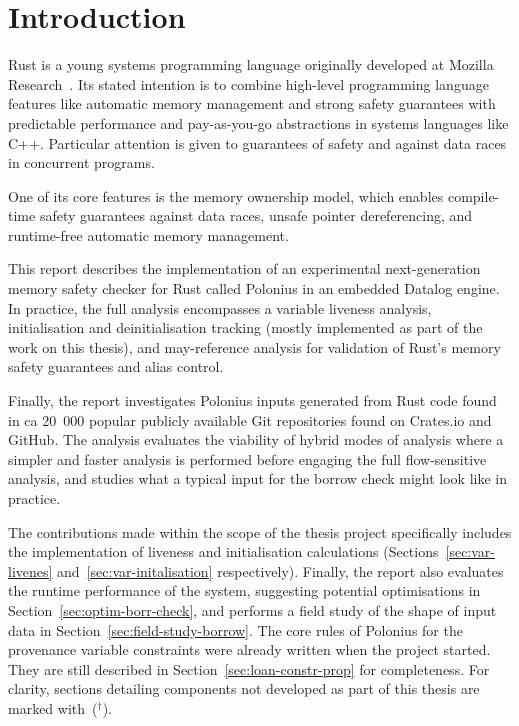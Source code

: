 \documentclass[11pt,a4paper,twoside,openany]{report}
\newcommand{\fixme}[1] {{\color{red}#1}}
\newcommand{\notmine}[0] {$^\dagger$}
\begin{document}
\begingroup
  \tableofcontents
  \listoffigures
  \listoftables
\endgroup
  

\chapter{Introduction}

Rust is a young systems programming language originally developed at Mozilla
Research~\cite{matsakis_rust_2014}. Its stated intention is to combine
high-level programming language features like automatic memory management and
strong safety guarantees with predictable performance and pay-as-you-go
abstractions in systems languages like C++. Particular attention is given to
guarantees of safety and against data races in concurrent programs.

One of its core features is the memory ownership model, which enables
compile-time safety guarantees against data races, unsafe pointer dereferencing,
and runtime-free automatic memory management.

This report describes the implementation of an experimental next-generation
memory safety checker for Rust called Polonius in an embedded Datalog engine. In
practice, the full analysis encompasses a variable liveness analysis,
initialisation and deinitialisation tracking (mostly implemented as part of the
work on this thesis), and may-reference analysis for validation of Rust's memory
safety guarantees and alias control.

Finally, the report investigates Polonius inputs generated from Rust code found
in ca 20~000 popular publicly available Git repositories found on Crates.io and
GitHub. The analysis evaluates the viability of hybrid modes of analysis where a
simpler and faster analysis is performed before engaging the full flow-sensitive
analysis, and studies what a typical input for the borrow check might look like
in practice.

The contributions made within the scope of the thesis project specifically
includes the implementation of liveness and initialisation calculations
(Sections~\ref{sec:var-livenes} and~\ref{sec:var-initalisation} respectively).
Finally, the report also evaluates the runtime performance of the system,
suggesting potential optimisations in Section~\ref{sec:optim-borr-check}, and
performs a field study of the shape of input data in
Section~\ref{sec:field-study-borrow}. The core rules of Polonius for the
provenance variable constraints were already written when the project started.
They are still described in Section~\ref{sec:loan-constr-prop} for completeness.
For clarity, sections detailing components not developed as part of this thesis
are marked with~(\notmine{}).
\end{document}
